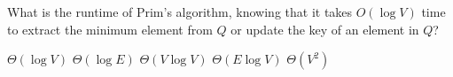 \documentclass[11  pt]{exam}
\begin{document}
\newpage

\begin{Qu}
	What is the runtime of Prim's algorithm, knowing that it takes $O(\log V)$ time to extract the minimum element from $Q$ or update the key of an element in $Q$?
	\begin{itemize}
		\aitem $\Theta(\log V)$
		\bitem $\Theta(\log E)$
		\citem $\Theta(V \log V)$
		\ditem $\Theta(E \log V)$
		\eitem $\Theta(V^2)$
	\end{itemize}
\end{Qu}
\end{document}
